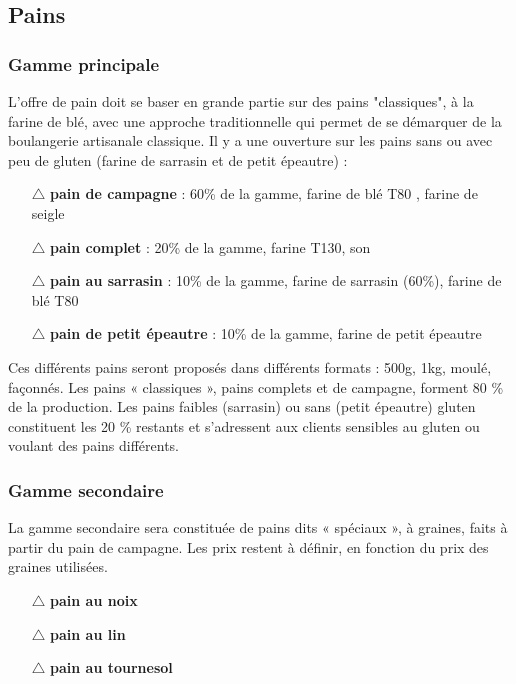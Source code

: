 \documentclass{book}
\begin{document}
\subsection{Pains}
\label{part:pains}

\subsubsection{Gamme principale}

L'offre de pain doit se baser en grande partie sur des pains "classiques", à la farine de blé, avec une approche traditionnelle qui permet de se démarquer de la boulangerie artisanale classique. Il y a une ouverture sur les pains sans ou avec peu de gluten (farine de sarrasin et de petit épeautre) :

\begin{itemize}

	\item[$\triangle$] \textbf{pain de campagne} : 60\% de la gamme, farine de blé T80 , farine de seigle
	\item[$\triangle$] \textbf{pain complet} : 20\% de la gamme, farine T130, son
	\item[$\triangle$] \textbf{pain au sarrasin} : 10\% de la gamme, farine de sarrasin (60\%), farine de blé T80
	\item[$\triangle$] \textbf{pain de petit épeautre} : 10\% de la gamme, farine de petit épeautre

\end{itemize}

Ces différents pains seront proposés dans différents formats : 500g, 1kg, moulé, façonnés. Les pains « classiques », pains complets et de campagne, forment 80 \% de la production. Les pains faibles (sarrasin) ou sans (petit épeautre) gluten constituent les 20 \% restants et s’adressent aux clients sensibles au gluten ou voulant des pains différents. 

\subsubsection{Gamme secondaire}

La gamme secondaire sera constituée de pains dits « spéciaux », à graines, faits à partir du pain de campagne. Les prix restent à définir, en fonction du prix des graines utilisées. 
\begin{itemize}

	\item[$\triangle$] \textbf{pain au noix}
	\item[$\triangle$] \textbf{pain au lin}
	\item[$\triangle$] \textbf{pain au tournesol}

\end{itemize}
      
\end{document}
